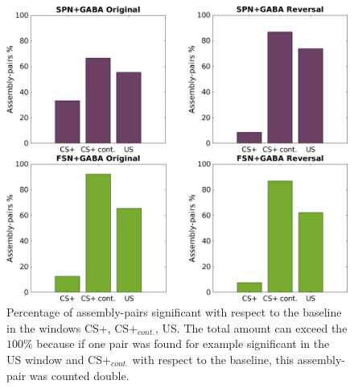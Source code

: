 \begin{figure}
    \centering
    \includegraphics[scale=0.34]{figures/SPN_GABAHisto.pdf}
    
    \vspace{1cm}
    
    \includegraphics[scale=0.34]{figures/FSN_GABAHisto.pdf}
    \caption{Percentage of assembly-pairs significant with respect to the baseline in the windows CS+, CS+$_{cont.}$, US. The total amount can exceed the $100\%$ because if one pair was found for example significant in the US window and CS+$_{cont.}$ with respect to the baseline, this assembly-pair was counted double.}
    \label{fig:FriedHistoGABA}
\end{figure}
\pagebreak
